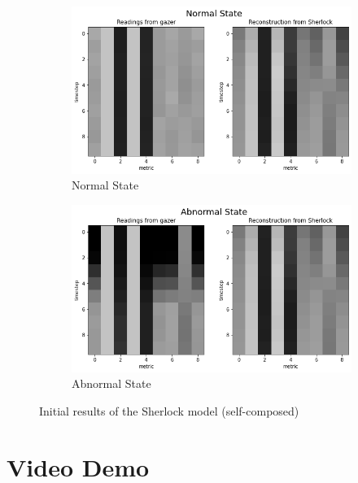 \begin{figure}[H]
    \centering
    \begin{subfigure}[b]{0.7\textwidth}
        \centering
        \includegraphics[width=\textwidth]{assets/implementation/normal-state.png}
        \caption{Normal State}
        \label{fig:normal-state}
    \end{subfigure}
    \hfill
    \begin{subfigure}[b]{0.7\textwidth}
        \centering
        \includegraphics[width=\textwidth]{assets/implementation/abnormal-state.png}
        \caption{Abnormal State}
        \label{fig:abnormal-state}
    \end{subfigure}
    \hfill
       \caption{Initial results of the Sherlock model (self-composed)}
\end{figure}

\section{Video Demo}